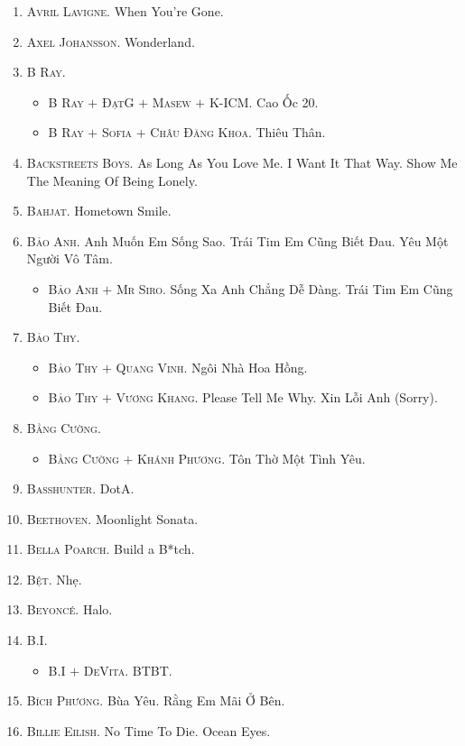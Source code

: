 \documentclass{article}
\begin{document}
\begin{enumerate}
	\item \textsc{Avril Lavigne.} When You're Gone.
	\item \textsc{Axel Johansson.} Wonderland.
	\item \textsc{B Ray.}
	\begin{itemize}
		\item \textsc{B Ray $+$ ĐạtG $+$ Masew $+$ K-ICM.} Cao Ốc 20.
		\item \textsc{B Ray $+$ Sofia $+$ Châu Đăng Khoa.} Thiêu Thân.
	\end{itemize}
	\item \textsc{Backstreets Boys.} As Long As You Love Me. I Want It That Way. Show Me The Meaning Of Being Lonely.
	\item \textsc{Bahjat.} Hometown Smile.
	\item \textsc{Bảo Anh.} Anh Muốn Em Sống Sao. Trái Tim Em Cũng Biết Đau. Yêu Một Người Vô Tâm.
	\begin{itemize}
		\item \textsc{Bảo Anh $+$ Mr Siro.} Sống Xa Anh Chẳng Dễ Dàng. Trái Tim Em Cũng Biết Đau.
	\end{itemize}
	\item \textsc{Bảo Thy.}
	\begin{itemize}
		\item \textsc{Bảo Thy $+$ Quang Vinh.} Ngôi Nhà Hoa Hồng.
		\item \textsc{Bảo Thy $+$ Vương Khang.} Please Tell Me Why. Xin Lỗi Anh (Sorry).
	\end{itemize}
	\item \textsc{Bằng Cường.}
	\begin{itemize}
		\item \textsc{Bằng Cường $+$ Khánh Phương.} Tôn Thờ Một Tình Yêu.
	\end{itemize}
	\item \textsc{Basshunter.} DotA.
	\item \textsc{Beethoven.} Moonlight Sonata.
	\item \textsc{Bella Poarch.} Build a B*tch.
	\item \textsc{Bệt.} Nhẹ.
	\item \textsc{Beyonc\'e.} Halo.
	\item \textsc{B.I.}
	\begin{itemize}
		\item \textsc{B.I $+$ DeVita.} BTBT.
	\end{itemize}
	\item \textsc{Bích Phương.} Bùa Yêu. Rằng Em Mãi Ở Bên.
	\item \textsc{Billie Eilish.} No Time To Die. Ocean Eyes.

\end{enumerate}
\end{document}
